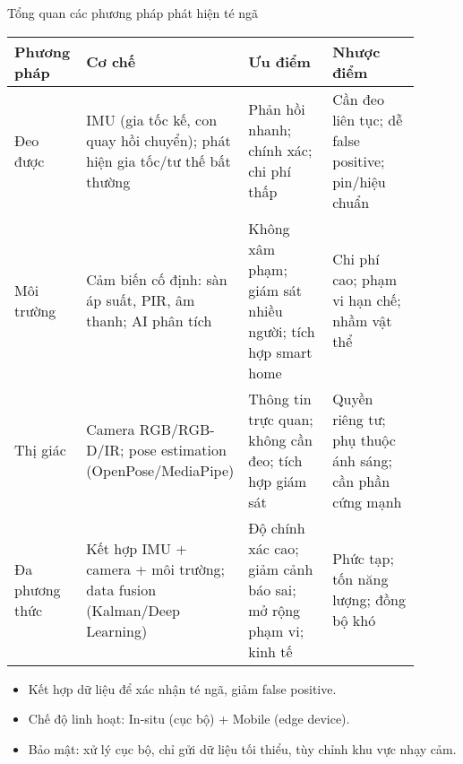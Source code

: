\begin{frame}{Tổng quan các phương pháp phát hiện té ngã}
\scriptsize
\begin{tabular}{|p{0.18\linewidth}|p{0.22\linewidth}|p{0.25\linewidth}|p{0.25\linewidth}|}
\hline
\textbf{Phương pháp} & \textbf{Cơ chế} & \textbf{Ưu điểm} & \textbf{Nhược điểm} \\
\hline
Đeo được & IMU (gia tốc kế, con quay hồi chuyển); phát hiện gia tốc/tư thế bất thường & Phản hồi nhanh; chính xác; chi phí thấp & Cần đeo liên tục; dễ false positive; pin/hiệu chuẩn \\
\hline
Môi trường & Cảm biến cố định: sàn áp suất, PIR, âm thanh; AI phân tích & Không xâm phạm; giám sát nhiều người; tích hợp smart home & Chi phí cao; phạm vi hạn chế; nhầm vật thể \\
\hline
Thị giác & Camera RGB/RGB-D/IR; pose estimation (OpenPose/MediaPipe) & Thông tin trực quan; không cần đeo; tích hợp giám sát & Quyền riêng tư; phụ thuộc ánh sáng; cần phần cứng mạnh \\
\hline
Đa phương thức & Kết hợp IMU + camera + môi trường; data fusion (Kalman/Deep Learning) & Độ chính xác cao; giảm cảnh báo sai; mở rộng phạm vi; kinh tế & Phức tạp; tốn năng lượng; đồng bộ khó \\
\hline
\end{tabular}

\vspace{0.3em}
\begin{itemize}\scriptsize
    \item Kết hợp dữ liệu để xác nhận té ngã, giảm false positive.  
    \item Chế độ linh hoạt: In-situ (cục bộ) + Mobile (edge device).  
    \item Bảo mật: xử lý cục bộ, chỉ gửi dữ liệu tối thiểu, tùy chỉnh khu vực nhạy cảm.
\end{itemize}
\end{frame}

